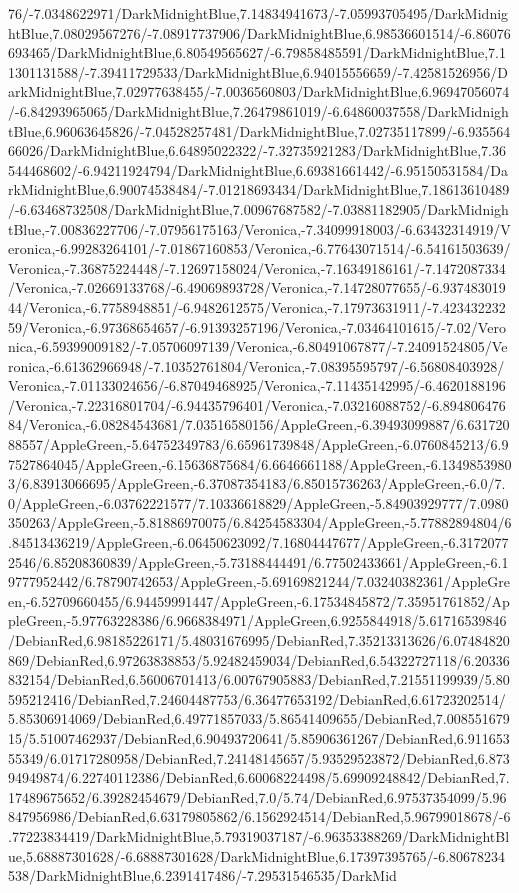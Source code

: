{\begin{tikzternal}
76/-7.0348622971/DarkMidnightBlue,7.14834941673/-7.05993705495/DarkMidnightBlue,7.08029567276/-7.08917737906/DarkMidnightBlue,6.98536601514/-6.86076693465/DarkMidnightBlue,6.80549565627/-6.79858485591/DarkMidnightBlue,7.11301131588/-7.39411729533/DarkMidnightBlue,6.94015556659/-7.42581526956/DarkMidnightBlue,7.02977638455/-7.0036560803/DarkMidnightBlue,6.96947056074/-6.84293965065/DarkMidnightBlue,7.26479861019/-6.64860037558/DarkMidnightBlue,6.96063645826/-7.04528257481/DarkMidnightBlue,7.02735117899/-6.93556466026/DarkMidnightBlue,6.64895022322/-7.32735921283/DarkMidnightBlue,7.36544468602/-6.94211924794/DarkMidnightBlue,6.69381661442/-6.95150531584/DarkMidnightBlue,6.90074538484/-7.01218693434/DarkMidnightBlue,7.18613610489/-6.63468732508/DarkMidnightBlue,7.00967687582/-7.03881182905/DarkMidnightBlue,-7.00836227706/-7.07956175163/Veronica,-7.34099918003/-6.63432314919/Veronica,-6.99283264101/-7.01867160853/Veronica,-6.77643071514/-6.54161503639/Veronica,-7.36875224448/-7.12697158024/Veronica,-7.16349186161/-7.1472087334/Veronica,-7.02669133768/-6.49069893728/Veronica,-7.14728077655/-6.93748301944/Veronica,-6.7758948851/-6.9482612575/Veronica,-7.17973631911/-7.42343223259/Veronica,-6.97368654657/-6.91393257196/Veronica,-7.03464101615/-7.02/Veronica,-6.59399009182/-7.05706097139/Veronica,-6.80491067877/-7.24091524805/Veronica,-6.61362966948/-7.10352761804/Veronica,-7.08395595797/-6.56808403928/Veronica,-7.01133024656/-6.87049468925/Veronica,-7.11435142995/-6.4620188196/Veronica,-7.22316801704/-6.94435796401/Veronica,-7.03216088752/-6.89480647684/Veronica,-6.08284543681/7.03516580156/AppleGreen,-6.39493099887/6.63172088557/AppleGreen,-5.64752349783/6.65961739848/AppleGreen,-6.0760845213/6.97527864045/AppleGreen,-6.15636875684/6.6646661188/AppleGreen,-6.13498539803/6.83913066695/AppleGreen,-6.37087354183/6.85015736263/AppleGreen,-6.0/7.0/AppleGreen,-6.03762221577/7.10336618829/AppleGreen,-5.84903929777/7.0980350263/AppleGreen,-5.81886970075/6.84254583304/AppleGreen,-5.77882894804/6.84513436219/AppleGreen,-6.06450623092/7.16804447677/AppleGreen,-6.31720772546/6.85208360839/AppleGreen,-5.73188444491/6.77502433661/AppleGreen,-6.19777952442/6.78790742653/AppleGreen,-5.69169821244/7.03240382361/AppleGreen,-6.52709660455/6.94459991447/AppleGreen,-6.17534845872/7.35951761852/AppleGreen,-5.97763228386/6.9668384971/AppleGreen,6.9255844918/5.61716539846/DebianRed,6.98185226171/5.48031676995/DebianRed,7.35213313626/6.07484820869/DebianRed,6.97263838853/5.92482459034/DebianRed,6.54322727118/6.20336832154/DebianRed,6.56006701413/6.00767905883/DebianRed,7.21551199939/5.80595212416/DebianRed,7.24604487753/6.36477653192/DebianRed,6.61723202514/5.85306914069/DebianRed,6.49771857033/5.86541409655/DebianRed,7.00855167915/5.51007462937/DebianRed,6.90493720641/5.85906361267/DebianRed,6.91165355349/6.01717280958/DebianRed,7.24148145657/5.93529523872/DebianRed,6.87394949874/6.22740112386/DebianRed,6.60068224498/5.69909248842/DebianRed,7.17489675652/6.39282454679/DebianRed,7.0/5.74/DebianRed,6.97537354099/5.96847956986/DebianRed,6.63179805862/6.1562924514/DebianRed,5.96799018678/-6.77223834419/DarkMidnightBlue,5.79319037187/-6.96353388269/DarkMidnightBlue,5.68887301628/-6.68887301628/DarkMidnightBlue,6.17397395765/-6.80678234538/DarkMidnightBlue,6.2391417486/-7.29531546535/DarkMid
\end{tikzternal}}
